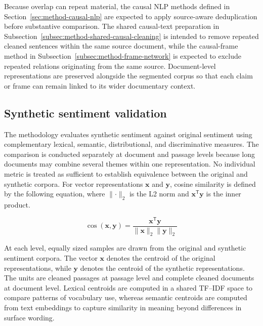 Because overlap can repeat material, the causal NLP methods defined in
Section~\ref{sec:method-causal-nlp} are expected to apply source-aware
deduplication before substantive comparison. The shared causal-text preparation in
Subsection~\ref{subsec:method-shared-causal-cleaning} is intended to remove repeated
cleaned sentences within the same source document, while the causal-frame method in
Subsection~\ref{subsec:method-frame-network} is expected to exclude repeated
relations originating from the same source. Document-level representations are
preserved alongside the segmented corpus so that each claim or frame can remain
linked to its wider documentary context.

\subsection{Synthetic sentiment validation}
\label{subsec:method-synthetic-validation}

The methodology evaluates synthetic sentiment against original sentiment using
complementary lexical, semantic, distributional, and discriminative measures. The
comparison is conducted separately at document and passage levels because long
documents may combine several themes within one representation. No individual metric
is treated as sufficient to establish equivalence between the original and synthetic
corpora. For vector representations $\mathbf{x}$ and $\mathbf{y}$, cosine similarity is defined by the following equation, where $\lVert\cdot\rVert_2$ is the L2 norm and $\mathbf{x}^{\mathsf T}\mathbf{y}$ is the inner product.

\begin{equation}
\operatorname{cos}(\mathbf{x},\mathbf{y})=
\frac{\mathbf{x}^{\mathsf T}\mathbf{y}}
{\lVert\mathbf{x}\rVert_2\lVert\mathbf{y}\rVert_2}
\label{eq:method-cosine-general}
\end{equation}

At each level, equally sized samples are drawn from the original and synthetic
sentiment corpora. The vector $\mathbf{x}$ denotes the centroid of the original
representations, while $\mathbf{y}$ denotes the centroid of the synthetic
representations. The units are cleaned passages at passage level and complete cleaned
documents at document level. Lexical centroids are computed in a shared TF--IDF space
to compare patterns of vocabulary use, whereas semantic centroids are computed from
text embeddings to capture similarity in meaning beyond differences in surface
wording.

